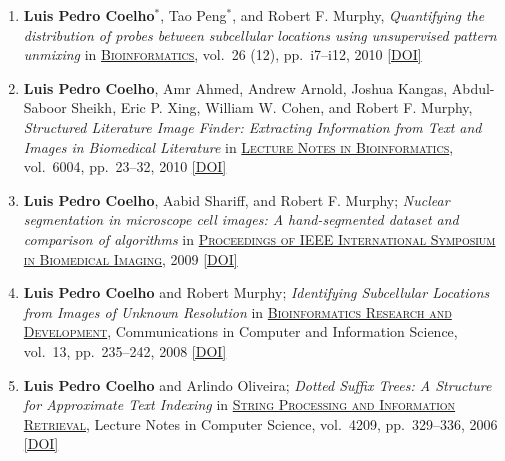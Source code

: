 \documentclass{article}
\newcommand\showdoi[1]{%
    \href{http://dx.doi.org/#1}{[DOI]}%
}
\newcommand\pubname[1]{\textsc{\uline{#1}}}
\newcommand\contribution[1]{\relax}
\newcommand\costar{${}^{*}$}
\begin{document}
\begin{enumerate}[resume]
\item \textbf{Luis Pedro Coelho}\costar, Tao Peng\costar, and Robert F.
Murphy, \emph{Quantifying the distribution of probes between subcellular
locations using unsupervised pattern unmixing} in \pubname{Bioinformatics},
vol.\ 26 (12), pp.\ i7--i12, 2010 \showdoi{10.1093/bioinformatics/btq220}
\contribution{I conceived of and implemented one of the methods presented and
wrote the manuscript.}

\item \textbf{Luis Pedro Coelho}, Amr Ahmed, Andrew Arnold, Joshua Kangas,
Abdul-Saboor Sheikh, Eric P. Xing, William W. Cohen, and Robert F. Murphy,
\emph{Structured Literature Image Finder: Extracting Information from Text and
Images in Biomedical Literature} in \pubname{Lecture Notes in Bioinformatics},
vol.\ 6004, pp.\ 23--32, 2010 \showdoi{10.1007/978-3-642-13131-8_4}
\contribution{With the paper below, this forms a package on the SLIF project,
where I enhanced the image analysis pipeline (for the analysis of figures in
published scientific literature). I wrote the first draft of this manuscript
and helped draft the one below.}

\item \textbf{Luis Pedro Coelho}, Aabid Shariff, and Robert F. Murphy;
\emph{Nuclear segmentation in microscope cell images: A hand-segmented dataset
and comparison of algorithms} in \pubname{Proceedings of IEEE International
Symposium in Biomedical Imaging}, 2009 \showdoi{10.1109/ISBI.2009.5193098}
\contribution{I acquired (part of) the microscopy data, built the
hand-segmented dataset, implemented the methods and wrote the first draft of
the manuscript.}

\item \textbf{Luis Pedro Coelho} and Robert Murphy; \emph{Identifying
Subcellular Locations from Images of Unknown Resolution} in
\pubname{Bioinformatics Research and Development}, Communications in Computer
and Information Science, vol.\ 13, pp.\ 235--242, 2008
\showdoi{10.1007/978-3-540-70600-7_18}
\contribution{I implemented the algorithm, ran the tests, and wrote the first
draft of the paper.}

\item \textbf{Luis Pedro Coelho} and Arlindo Oliveira; \emph{Dotted Suffix
Trees: A Structure for Approximate Text Indexing} in \pubname{String Processing
and Information Retrieval}, Lecture Notes in Computer Science, vol.\ 4209, pp.\
329--336, 2006 \showdoi{10.1007/11880561_27}
\contribution{I developed and implemented the algorithm and wrote the first
draft of the manuscript.}

\end{enumerate}
\end{document}
